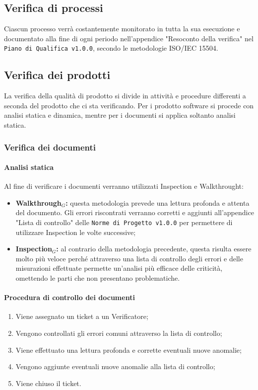 \subsection{Verifica di processi}
Ciascun processo verrà costantemente monitorato in tutta la sua esecuzione e documentato alla fine di ogni periodo nell'appendice "Resoconto della verifica" nel \texttt{Piano di Qualifica v1.0.0}, secondo le metodologie ISO/IEC 15504.
\subsection{Verifica dei prodotti}
La verifica della qualità di prodotto si divide in attività e procedure differenti a seconda del prodotto che ci sta verificando. Per i prodotto software si procede con analisi statica e dinamica, mentre per i documenti si applica soltanto analisi statica.
\subsubsection{Verifica dei documenti}
\paragraph{Analisi statica}
Al fine di verificare i documenti verranno utilizzati Inspection e Walkthrought:
\begin{itemize}
	\item \textbf{Walkthrough$_{G}$:} questa metodologia prevede una lettura profonda e attenta del documento. Gli errori riscontrati verranno corretti e aggiunti all'appendice "Lista di controllo" delle \texttt{Norme di Progetto v1.0.0} per permettere di utilizzare Inspection le volte successive;
	\item \textbf{Inspection$_{G}$:} al contrario della metodologia precedente, questa risulta essere molto più veloce perché attraverso una lista di controllo degli errori e delle misurazioni effettuate permette un'analisi più efficace delle criticità, omettendo le parti che non presentano problematiche. 
\end{itemize}
\paragraph{Procedura di controllo dei documenti}
\begin{enumerate}
	\item Viene assegnato un ticket a un Verificatore;
	\item Vengono controllati gli errori comuni attraverso la lista di controllo;
	\item Viene effettuato una lettura profonda e corrette eventuali nuove anomalie;
	\item Vengono aggiunte eventuali nuove anomalie alla lista di controllo;
	\item Viene chiuso il ticket.
\end{enumerate}
